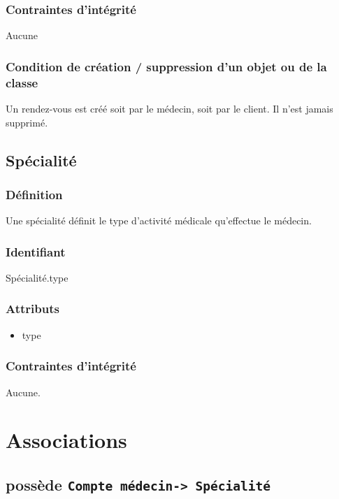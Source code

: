 \subsubsection{Contraintes d'intégrité}

Aucune

\subsubsection{Condition de création / suppression d'un objet ou de la classe}

Un rendez-vous est créé soit par le médecin, soit par le client. Il n'est jamais supprimé.

\subsection{Spécialité}

\subsubsection{Définition}

Une spécialité définit le type d'activité médicale qu'effectue le médecin.

\subsubsection{Identifiant}

Spécialité.type

\subsubsection{Attributs}

\begin{itemize}
    \item type
\end{itemize}

\subsubsection{Contraintes d'intégrité}

Aucune.

\newpage
\section{Associations}

\subsection{possède \texttt{Compte médecin-> Spécialité}}
